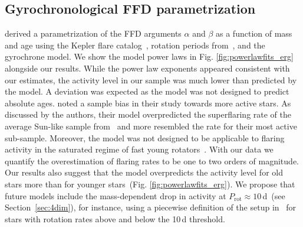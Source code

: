 \documentclass{aa}
\begin{document}
\subsection{Gyrochronological FFD parametrization}
\label{sec:davenport}
\citet{davenport2019} derived a parametrization of the FFD arguments $\alpha$ and $\beta$ as a function of mass and age using the Kepler flare catalog~\citep{davenport_kepler_2016}, rotation periods from~\citet{mcquillan2014}, and the \citet{mamajek2008} gyrochrone model. We show the model power laws in Fig. \ref{fig:powerlawfits_erg} alongside our results. While the power law exponents appeared consistent with our estimates, the activity level in our sample was much lower than predicted by the model. A deviation was expected as the model was not designed to predict absolute ages. \citet{davenport2019} noted a sample bias in their study towards more active stars. As discussed by the authors, their model overpredicted the superflaring rate of the average Sun-like sample from~\citet{shibayama2013} and more resembled the rate for their most active sub-sample. Moreover, the model was not designed to be applicable to flaring activity in the saturated regime of fast young rotators~\citep{jackman2020}. With our data we quantify the overestimation of flaring rates to be one to two orders of magnitude. Our results also suggest that the model overpredicts the activity level for old stars more than for younger stars~(Fig. \ref{fig:powerlawfits_erg}). We propose that future models include the mass-dependent drop in activity at $P_\mathrm{rot}\approx 10\,$d~(see Section~\ref{sec:4dim}), for instance, using a piecewise definition of the setup in~\citet{davenport2019} for stars with rotation rates above and below the 10\,d threshold.
\end{document}
